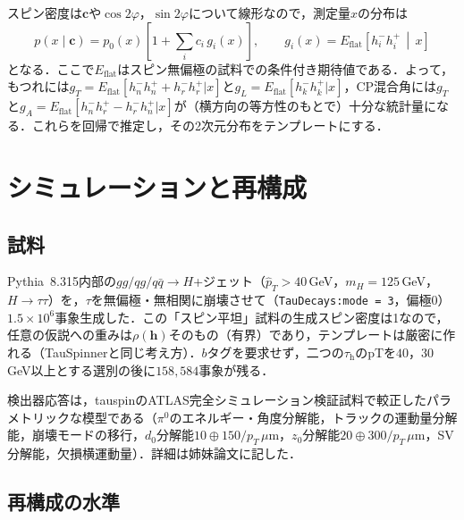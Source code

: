 \documentclass[paper=a4,fontsize=10pt,jafontsize=10pt,line_length=44zw,number_of_lines=46]{jlreq}
\newcommand{\tauh}{\tau_{\mathrm{h}}}
\newcommand{\hvec}{\boldsymbol{h}}
\begin{document}
スピン密度は$\boldsymbol c$や$\cos2\varphi$，$\sin2\varphi$について線形なので，測定量$x$の分布は
\begin{equation}
  p(x\mid\boldsymbol c)=p_0(x)\left[1+\sum_i c_i\,g_i(x)\right],\qquad g_i(x)=E_{\mathrm{flat}}\!\left[h^-_ih^+_i\,\middle|\,x\right]
\end{equation}
となる．ここで$E_{\mathrm{flat}}$はスピン無偏極の試料での条件付き期待値である．よって，もつれには$g_T=E_{\mathrm{flat}}[h^-_nh^+_n+h^-_rh^+_r|x]$と$g_L=E_{\mathrm{flat}}[h^-_kh^+_k|x]$，CP混合角には$g_T$と$g_A=E_{\mathrm{flat}}[h^-_nh^+_r-h^-_rh^+_n|x]$が（横方向の等方性のもとで）十分な統計量になる．これらを回帰で推定し，その2次元分布をテンプレートにする．

\section{シミュレーションと再構成}\label{sec:sim}

\subsection{試料}

Pythia~8.315\cite{Bierlich:2022pfr}内部の$gg/qg/q\bar q\to H$+ジェット（$\hat p_T>40$\,GeV，$m_H=125$\,GeV，$H\to\tau\tau$）を，$\tau$を無偏極・無相関に崩壊させて（\texttt{TauDecays:mode = 3}，偏極0）$1.5\times10^6$事象生成した．この「スピン平坦」試料の生成スピン密度は1なので，任意の仮説への重みは$\rho(\hvec)$そのもの（有界）であり，テンプレートは厳密に作れる（TauSpinner\cite{Czyczula:2012ny}と同じ考え方）．$b$タグを要求せず，二つの$\tauh$のpTを$40$，$30$\,GeV以上とする選別の後に$158{,}584$事象が残る．

検出器応答は，tauspinのATLAS完全シミュレーション検証試料で較正したパラメトリックな模型である（$\pi^0$のエネルギー・角度分解能，トラックの運動量分解能，崩壊モードの移行，$d_0$分解能$10\oplus150/p_T\,\mu$m，$z_0$分解能$20\oplus300/p_T\,\mu$m，SV分解能，欠損横運動量）．詳細は姉妹論文\cite{dihiggs:paper}に記した．

\subsection{再構成の水準}
\end{document}
